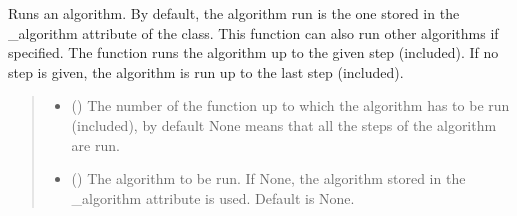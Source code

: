 \documentclass[letterpaper,10pt,english]{sphinxmanual}
\begin{document}
\begin{fulllineitems}
\begin{fulllineitems}
\label{\detokenize{source/_autosummary/HDF5_BLS_treat.Treat_backend:HDF5_BLS_treat.Treat_backend.silent_run_algorithm}}
\pysigstartsignatures
\pysiglinewithargsret
{}
{\sphinxparamcomma {}}
{}
\pysigstopsignatures
\sphinxAtStartPar
Runs an algorithm. By default, the algorithm run is the one stored in the \_algorithm attribute of the class. This function can also run other algorithms if specified. The function runs the algorithm up to the given step (included). If no step is given, the algorithm is run up to the last step (included).
\begin{quote}\begin{description}
\begin{itemize}
\item {} 
\sphinxAtStartPar
{} (\sphinxstyleliteralemphasis{\sphinxupquote{, }}) \textendash{} The number of the function up to which the algorithm has to be run (included), by default None means that all the steps of the algorithm are run.

\item {} 
\sphinxAtStartPar
{} (\sphinxstyleliteralemphasis{\sphinxupquote{, }}) \textendash{} The algorithm to be run. If None, the algorithm stored in the \_algorithm attribute is used. Default is None.

\end{itemize}

\end{description}\end{quote}

\end{fulllineitems}



\end{fulllineitems}
\end{document}
